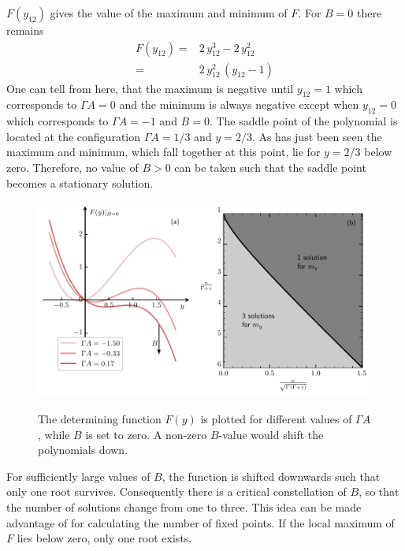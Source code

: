 $F(y_{12})$ gives the value of the maximum and minimum of $F$. For $B=0$ there remains
\begin{align*}
    F(y_{12})=&2\,y_{12}^3-2\,y_{12}^2\\
    =&2\,y_{12}^2\,(y_{12}-1)
\end{align*}
One can tell from here, that the maximum is negative until $y_{12}=1$ which corresponds to $\Gamma A =0$ and the minimum is always negative except when $y_{12}=0$ which corresponds to $\Gamma A=-1$ and $B=0$. The saddle point of the polynomial is located at the configuration $\Gamma A=1/3$ and $y=2/3$. As has just been seen the maximum and minimum, which fall together at this point, lie for $y=2/3$ below zero. Therefore, no value of $B>0$ can be taken such that the saddle point becomes a stationary solution.  
\begin{figure}[H]
    \centering
    \caption{The determining function $F(y)$ is plotted for different values of $\Gamma A$, while $B$ is set to zero. A non-zero $B$-value would shift the polynomials down.}
    \includegraphics{pictures/polynomial_scheme_phase.pdf}
    \label{fig:numb_fixp}
\end{figure}
For sufficiently large values of $B$, the function is shifted downwards such that only one root survives. Consequently there is a critical constellation of $B$, so that the number of solutions change from one to three. This idea can be made advantage of for calculating the number of fixed points. If the local maximum of $F$ lies below zero, only one root exists.
